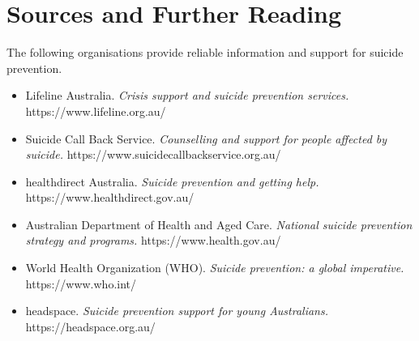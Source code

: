 \section*{Sources and Further Reading}
The following organisations provide reliable information and support for suicide prevention.

\begin{itemize}
    \item Lifeline Australia. \textit{Crisis support and suicide prevention services.} https://www.lifeline.org.au/
    \item Suicide Call Back Service. \textit{Counselling and support for people affected by suicide.} https://www.suicidecallbackservice.org.au/
    \item healthdirect Australia. \textit{Suicide prevention and getting help.} https://www.healthdirect.gov.au/
    \item Australian Department of Health and Aged Care. \textit{National suicide prevention strategy and programs.} https://www.health.gov.au/
    \item World Health Organization (WHO). \textit{Suicide prevention: a global imperative.} https://www.who.int/
    \item headspace. \textit{Suicide prevention support for young Australians.} https://headspace.org.au/
\end{itemize}

\clearpage
